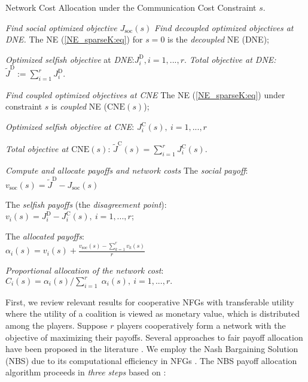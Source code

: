 \documentclass[12pt, draftclsnofoot,onecolumn]{IEEEtran}
\begin{document}
\begin{algorithm}[!b]
	 \caption{Network Cost Allocation under the Communication Cost Constraint $s$.}
	 \label{alg3:alg}
	\begin{algorithmic}
	 {\it Find social optimized objective $J_{\mathrm{soc}}(s)$} 
	\Indent
\EndIndent
	 {\it Find decoupled optimized objectives at DNE.} 
	\Indent
	 {The NE (\ref{NE_sparseK:eq}) for $s=0$ is the {\it decoupled} NE (DNE);}

	 {{\it Optimized selfish objective} at {\it DNE}:$J_i^{\mathrm{D}},i = 1,..., r.$}
	 {{\it Total objective at DNE:} ${\tilde J}^{\mathrm{D}} := \sum_{i=1}^{r}{J_i^{\mathrm{D}}}$.}

	\EndIndent
	 {\it Find coupled optimized objectives at CNE}
	\Indent
	 {The NE (\ref{NE_sparseK:eq}) under constraint $s$ is {\it coupled} NE ($\mathrm{CNE}(s)$);}

	 {{\it Optimized selfish objective at CNE}:
	$J_i^{\mathrm{C}}(s), ~i = 1,...,r$}

	 {{\it Total objective at $\mathrm{CNE}(s)$}: ${\tilde J}^{\mathrm{C}}(s) = \sum_{i=1}^{r}{J_i^{\mathrm{C}}(s)}.$}

	\EndIndent
	 {\it Compute and allocate payoffs and network costs} 
	\Indent
	 {The {\it social payoff}: $v_{\mathrm{soc}}(s) = {\tilde J}^{\mathrm{D}} - J_{\mathrm{soc}}(s)$}

	 {The {\it selfish payoffs} (the {\it disagreement point}):\\
	 $v_i(s) = J_i^{\mathrm{D}} - J_i^{\mathrm{C}}(s), ~i = 1, ..., r$;}

     {The {\it allocated payoffs}:\\
     $\alpha_i(s)=v_i(s)+ \frac{v_{\mathrm{soc}}(s) - \sum_{k=1}^r{v_k(s)}}{r}$}

      {{\it Proportional allocation of the network cost}:\\ $C_i(s) = \alpha_i(s)/\sum_{i=1}^{r}􏰌{\alpha_i(s)}, ~i=1,...,r.$}
   
    \EndIndent
	 \end{algorithmic}
\end{algorithm}

First, we review relevant results for cooperative NFGs with transferable utility \cite{Peters2008} where the utility of a coalition is viewed as monetary value, which is distributed among the players. Suppose $r$ players cooperatively form a network with the objective of maximizing their payoffs. Several approaches to fair payoff allocation have been proposed in the literature \cite{saad2009distributed,myerson1980conference,Avrachenkov2015265,kawamori2016nash}. We employ the Nash Bargaining Solution (NBS) due to its computational efficiency in NFGs \cite{Avrachenkov2015265,kawamori2016nash}. The NBS payoff allocation algorithm proceeds in {\it three steps} based on \cite{kawamori2016nash}: 
\end{document}
